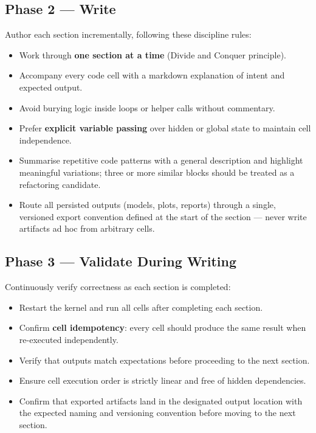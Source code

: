 \documentclass[11pt, a4paper]{article}
\begin{document}
\subsection*{Phase 2 — Write}

Author each section incrementally, following these discipline rules:

\begin{itemize}
  \item Work through \textbf{one section at a time} (Divide and Conquer
    principle).

  \item Accompany every code cell with a markdown explanation of intent and
    expected output.

  \item Avoid burying logic inside loops or helper calls without commentary.

  \item Prefer \textbf{explicit variable passing} over hidden or global state
    to maintain cell independence.

  \item Summarise repetitive code patterns with a general description and
    highlight meaningful variations; three or more similar blocks should be
    treated as a refactoring candidate.

  \item Route all persisted outputs (models, plots, reports) through a single,
    versioned export convention defined at the start of the section — never
    write artifacts ad hoc from arbitrary cells.
\end{itemize}

\subsection*{Phase 3 — Validate During Writing}

Continuously verify correctness as each section is completed:

\begin{itemize}
  \item Restart the kernel and run all cells after completing each section.

  \item Confirm \textbf{cell idempotency}: every cell should produce the same
    result when re-executed independently.

  \item Verify that outputs match expectations before proceeding to the next
    section.

  \item Ensure cell execution order is strictly linear and free of hidden
    dependencies.

  \item Confirm that exported artifacts land in the designated output location
    with the expected naming and versioning convention before moving to the
    next section.
\end{itemize}
\end{document}
